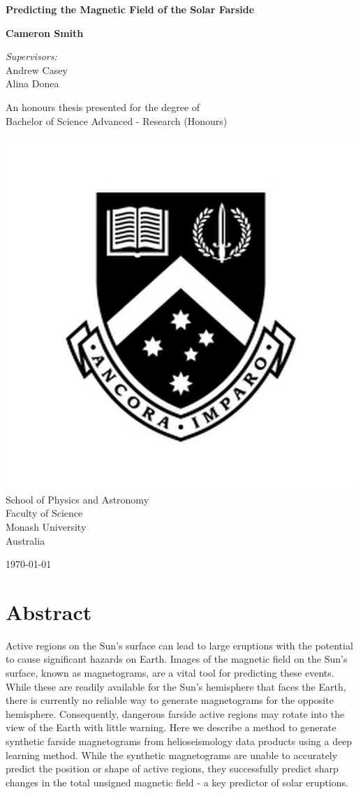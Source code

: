 \documentclass[11pt,a4paper,onecolumn]{report}
\begin{document}
\begin{titlepage}
  \begin{center}
    \vspace*{2cm}
    \Huge
    \textbf{Predicting the Magnetic Field of the Solar Farside}

    \vspace{2cm}
    \LARGE
    \textbf{Cameron Smith}

    \vspace{0.8cm}
    \Large \textit{Supervisors:}\\
    Andrew Casey\\
    Alina Donea

    \vfill
    \large
    An honours thesis presented for the degree of\\
    Bachelor of Science Advanced - Research (Honours)

    \vspace{0.3cm}
    \includegraphics[width=0.2\linewidth]{"Monash_Logo"}\\
    School of Physics and Astronomy\\
    Faculty of Science\\
    Monash University\\
    Australia

    \vspace{0.5cm}

    \today

  \end{center}
\end{titlepage}

\chapter*{Abstract}
Active regions on the Sun's surface can lead to large eruptions with the
potential to cause significant hazards on Earth. Images of the magnetic field on
the Sun's surface, known as magnetograms, are a vital tool for predicting these
events. While these are readily available for the Sun's hemisphere that faces
the Earth, there is currently no reliable way to generate magnetograms for the
opposite hemisphere. Consequently, dangerous farside active regions
may rotate into the view of the Earth with little warning. Here we describe a
method to generate synthetic farside magnetograms from helioseismology data
products using a deep learning method. While the synthetic magnetograms are
unable to accurately predict the position or shape of active regions, they
successfully predict sharp changes in the total unsigned magnetic field - a key
predictor of solar eruptions.
\end{document}
